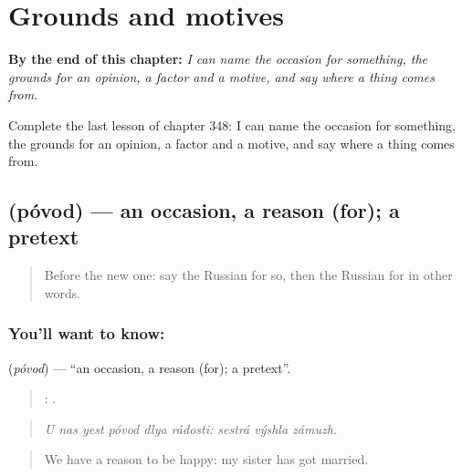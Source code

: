 
\chapter{Grounds and motives}
\label{ch:ru-grounds-and-motives}

\begin{chapteropening}
\textbf{By the end of this chapter:} \emph{I can name the occasion for something, the grounds for an opinion, a factor and a motive, and say where a thing comes from.}

Complete the last lesson of chapter 348: I can name the occasion for something, the grounds for an opinion, a factor and a motive, and say where a thing comes from.
\end{chapteropening}

\section[\texorpdfstring{\ru{повод} (póvod)}{повод (póvod)}]{ (póvod) — an occasion, a reason (for); a pretext}

\label{lesson:RU-C348-povod}



\begin{quote}
Before the new one: say the Russian for so, then the Russian for in other words.
\end{quote}

\subsection*{You'll want to know: }
\textbf{} (\emph{póvod}) — \textquotedblleft{}an occasion, a reason (for); a pretext\textquotedblright{}.

\begin{quote}
     :   .
\end{quote}

\begin{quote}
\emph{U nas yest póvod dlya rádosti: sestrá výshla zámuzh.}
\end{quote}

\begin{quote}
We have a reason to be happy: my sister has got married.
\end{quote}

